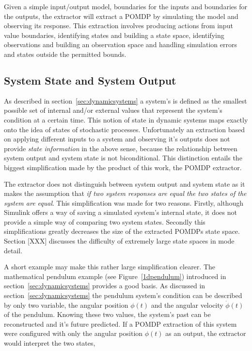 Given a simple input/output model, boundaries for the inputs and boundaries for the outputs, the extractor will extract a POMDP by simulating the model and observing its response. This extraction involves producing actions from input value boundaries, identifying states and building a state space, identifying observations and building an observation space and handling simulation errors and states outside the permitted bounds.

\subsection{System State and System Output}

As described in section~\ref{sec:dynamicsystems} a system's  is defined as the smallest possible set of internal and/or external values that represent the system's condition at a certain time. This notion of state in dynamic systems maps exactly onto the idea of states of stochastic processes. Unfortunately an extraction based on applying different inputs to a system and observing it's outputs does not provide \textit{state information} in the above sense, because the relationship between system output and system state is not biconditional. This distinction entails the biggest simplification made by the product of this work, the POMDP extractor.

The extractor does not distinguish between system output and system state as it makes the assumption that \textit{if two system responses are equal the two states of the system are equal}. This simplification was made for two reasons. Firstly, although Simulink offers a way of saving a simulated system's internal state, it does not provide a simple way of comparing two system states. Secondly this simplifications greatly decreases the size of the extracted POMDPs state space. Section [XXX] discusses the difficulty of extremely large state spaces in mode detail.

A short example may make this rather large simplification clearer. The mathematical pendulum example (see Figure~\ref{1dpendulum}) introduced in section~\ref{sec:dynamicsystems} provides a good basis. As discussed in section~\ref{sec:dynamicsystems} the pendulum system's condition can be described by only two variable, the angular position $\phi(t)$ and the angular velocity $\dot{\phi}(t)$ of the pendulum. Knowing these two values, the system's past can be reconstructed and it's future predicted. If a POMDP extraction of this system were configured with only the angular position $\phi(t)$ as an output, the extractor would interpret the two states,

